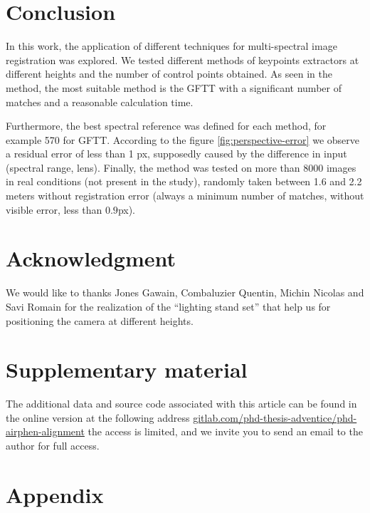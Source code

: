 \documentclass[]{elsarticle}
\begin{document}
	
	
	\pagebreak
	\section{Conclusion}
	
	In this work, the application of different techniques for multi-spectral image registration was explored.
	We tested different methods of keypoints extractors at different heights and the number of control points obtained.
	As seen in the method, the most suitable method is the GFTT with a significant number of matches and a reasonable calculation time.
	
	Furthermore, the best spectral reference was defined for each method, for example 570 for GFTT.
	According to the figure \ref{fig:perspective-error} we observe a residual error of less than 1 px,
	supposedly caused by the difference in input (spectral range, lens).
	Finally, the method was tested on more than 8000 images in real conditions (not present in the study),
	randomly taken between 1.6 and 2.2 meters without registration error (always a minimum number of matches, without visible error, less than $0.9$px).
		
	\section{Acknowledgment}
	
	We would like to thanks Jones Gawain, Combaluzier Quentin, Michin Nicolas and Savi Romain
	for the realization of the ``lighting stand set'' that help us for positioning the camera at different heights.
	
	\section{Supplementary material}
	
	The additional data and source code associated with this article can be found in the online version at the following address
	\url{gitlab.com/phd-thesis-adventice/phd-airphen-alignment} the access is limited,
	and we invite you to send an email to the author for full access.
	
	\onecolumn
	\section{Appendix}
\end{document}
